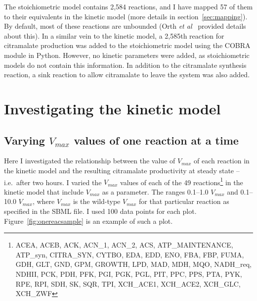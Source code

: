\documentclass[parskip=full]{scrreprt}
\begin{document}
The stoichiometric model contains 2,584 reactions, and I have mapped 57 of them to their equivalents in the kinetic model (more details in section~\vref{sec:mapping}). By default, most of these reactions are unbounded (Orth \emph{et al}~\cite{orth_comprehensive_2011} provided details about this). In a similar vein to the kinetic model, a 2,585th reaction for citramalate production was added to the stoichiometric model using the COBRA module in Python. However, no kinetic parameters were added, as stoichiometric models do not contain this information. In addition to the citramalate synthesis reaction, a sink reaction to allow citramalate to leave the system was also added.

\chapter{Investigating the kinetic model}
\label{ch:kinetic}


\section{Varying $V_{max}$ values of one reaction at a time}
\label{sec:onereac}

Here I investigated the relationship between the value of $V_{max}$ of each reaction in the kinetic model and the resulting citramalate productivity at steady state -- i.e.\ after two hours. I varied the $V_{max}$ values of each of the 49 reactions\footnote{ACEA, ACEB, ACK, ACN\_1, ACN\_2, ACS, ATP\_MAINTENANCE, ATP\_syn, CITRA\_SYN, CYTBO, EDA, EDD, ENO, FBA, FBP, FUMA, GDH, GLT, GND, GPM, GROWTH, LPD, MAD, MDH, MQO, NADH\_req, NDHII, PCK, PDH, PFK, PGI, PGK, PGL, PIT, PPC, PPS, PTA, PYK, RPE, RPI, SDH, SK, SQR, TPI, XCH\_ACE1, XCH\_ACE2, XCH\_GLC, XCH\_ZWF} in the kinetic model that include $V_{max}$ as a parameter. The ranges 0.1--1.0 $V_{max}$ and 0.1--10.0 $V_{max}$, where $V_{max}$ is the wild-type $V_{max}$ for that particular reaction as specified in the SBML file. I used 100 data points for each plot. Figure~\ref{fig:onereacsample} is an example of such a plot.
\end{document}

